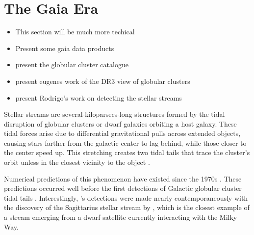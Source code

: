 \section{The Gaia Era}
    \begin{itemize}
        \item This section will be much more techical 
        \item Present some gaia data products 
        \item present the globular cluster catalogue
        \item present eugenes work of the DR3 view of globular clusters 
        \item present Rodrigo's work on detecting the stellar streams 
    \end{itemize}


  Stellar streams are several-kiloparsecs-long structures formed by the tidal disruption of globular clusters or dwarf galaxies orbiting a host galaxy. These tidal forces arise due to differential gravitational pulls across extended objects, causing stars farther from the galactic center to lag behind, while those closer to the center speed up. This stretching creates two tidal tails that trace the cluster's orbit unless in the closest vicinity to the object \citep{2007ApJ...659.1212M}. 
  
  Numerical predictions of this phenomenon have existed since the 1970s \citep[see, e.g.,][]{1975AJ.....80..290K}. These predictions occurred well before the first detections of Galactic globular cluster tidal tails \citep{1995AJ....109.2553G}. Interestingly, \citet{1995AJ....109.2553G}'s detections were made nearly contemporaneously with the discovery of the Sagittarius stellar stream by \citet{1994Natur.370..194I}, which is the closest example of a stream emerging from a dwarf satellite currently interacting with the Milky Way. 
  
